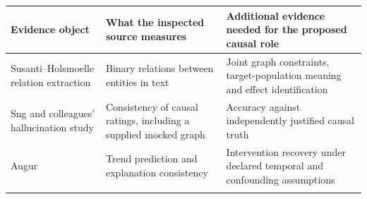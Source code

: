 \begin{longtable}[]{@{}lll@{}}
\toprule
\begin{minipage}[b]{0.30\columnwidth}\raggedright
Evidence object\strut
\end{minipage} & \begin{minipage}[b]{0.30\columnwidth}\raggedright
What the inspected source measures\strut
\end{minipage} & \begin{minipage}[b]{0.30\columnwidth}\raggedright
Additional evidence needed for the proposed causal role\strut
\end{minipage}\tabularnewline
\midrule
\endhead
\begin{minipage}[t]{0.30\columnwidth}\raggedright
Susanti--Holsmoelle relation extraction\strut
\end{minipage} & \begin{minipage}[t]{0.30\columnwidth}\raggedright
Binary relations between entities in text\strut
\end{minipage} & \begin{minipage}[t]{0.30\columnwidth}\raggedright
Joint graph constraints, target-population meaning and effect
identification\strut
\end{minipage}\tabularnewline
\begin{minipage}[t]{0.30\columnwidth}\raggedright
Sng and colleagues' hallucination study\strut
\end{minipage} & \begin{minipage}[t]{0.30\columnwidth}\raggedright
Consistency of causal ratings, including a supplied mocked graph\strut
\end{minipage} & \begin{minipage}[t]{0.30\columnwidth}\raggedright
Accuracy against independently justified causal truth\strut
\end{minipage}\tabularnewline
\begin{minipage}[t]{0.30\columnwidth}\raggedright
Augur\strut
\end{minipage} & \begin{minipage}[t]{0.30\columnwidth}\raggedright
Trend prediction and explanation consistency\strut
\end{minipage} & \begin{minipage}[t]{0.30\columnwidth}\raggedright
Intervention recovery under declared temporal and confounding
assumptions\strut
\end{minipage}\tabularnewline
\begin{minipage}[t]{0.30\columnwidth}\raggedright

\end{minipage}
\end{longtable}
